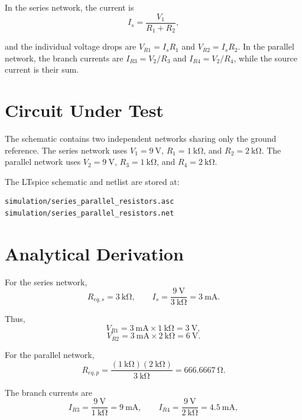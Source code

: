 \documentclass[11pt,a4paper]{article}
\begin{document}
In the series network, the current is
\begin{equation}
I_s=\frac{V_1}{R_1+R_2},
\end{equation}

and the individual voltage drops are $V_{R1}=I_sR_1$ and $V_{R2}=I_sR_2$. In the parallel network, the branch currents are $I_{R3}=V_2/R_3$ and $I_{R4}=V_2/R_4$, while the source current is their sum.

\section{Circuit Under Test}

The schematic contains two independent networks sharing only the ground reference. The series network uses $V_1=\SI{9}{\volt}$, $R_1=\SI{1}{\kilo\ohm}$, and $R_2=\SI{2}{\kilo\ohm}$. The parallel network uses $V_2=\SI{9}{\volt}$, $R_3=\SI{1}{\kilo\ohm}$, and $R_4=\SI{2}{\kilo\ohm}$.

The LTspice schematic and netlist are stored at:

\begin{verbatim}
simulation/series_parallel_resistors.asc
simulation/series_parallel_resistors.net
\end{verbatim}

\section{Analytical Derivation}

For the series network,
\begin{equation}
R_{eq,s}=\SI{3}{\kilo\ohm},
\qquad
I_s=\frac{\SI{9}{\volt}}{\SI{3}{\kilo\ohm}}=\SI{3}{\milli\ampere}.
\end{equation}

Thus,
\begin{equation}
V_{R1}=\SI{3}{\milli\ampere}\times\SI{1}{\kilo\ohm}=\SI{3}{\volt},
\end{equation}
\begin{equation}
V_{R2}=\SI{3}{\milli\ampere}\times\SI{2}{\kilo\ohm}=\SI{6}{\volt}.
\end{equation}

For the parallel network,
\begin{equation}
R_{eq,p}=\frac{(\SI{1}{\kilo\ohm})(\SI{2}{\kilo\ohm})}{\SI{3}{\kilo\ohm}}
=\SI{666.6667}{\ohm}.
\end{equation}

The branch currents are
\begin{equation}
I_{R3}=\frac{\SI{9}{\volt}}{\SI{1}{\kilo\ohm}}=\SI{9}{\milli\ampere},
\qquad
I_{R4}=\frac{\SI{9}{\volt}}{\SI{2}{\kilo\ohm}}=\SI{4.5}{\milli\ampere},
\end{equation}
\end{document}
